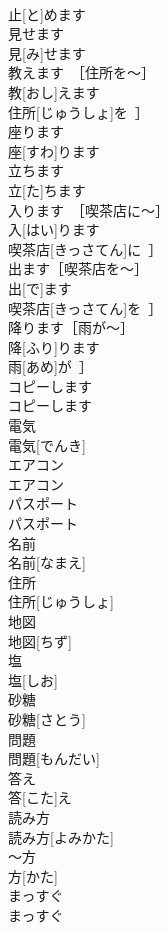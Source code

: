 \documentclass[8pt]{extreport}
\begin{document}
\begin{CJK}{UTF8}{min}
\\	止[と]めます	
\\	見せます	
\\	見[み]せます	
\\	教えます　［住所を～］	
\\	教[おし]えます　
\\	住所[じゅうしょ]を~］	
\\	座ります	
\\	座[すわ]ります	
\\	立ちます	
\\	立[た]ちます	
\\	入ります　［喫茶店に～］	
\\	入[はい]ります　
\\	喫茶店[きっさてん]に~］	
\\	出ます［喫茶店を～］	
\\	出[で]ます
\\	喫茶店[きっさてん]を~］	
\\	降ります［雨が～］	
\\	降[ふり]ります
\\	雨[あめ]が~］	
\\	コピーします	
\\	コピーします	
\\	電気	
\\	電気[でんき]	
\\	エアコン	
\\	エアコン	
\\	パスポート	
\\	パスポート	
\\	名前	
\\	名前[なまえ]	
\\	住所	
\\	住所[じゅうしょ]	
\\	地図	
\\	地図[ちず]	
\\	塩	
\\	塩[しお]	
\\	砂糖	
\\	砂糖[さとう]	
\\	問題	
\\	問題[もんだい]	
\\	答え	
\\	答[こた]え	
\\	読み方	
\\	読み方[よみかた]	
\\	～方	
\\	方[かた]	
\\	まっすぐ	
\\	まっすぐ	

\end{CJK}
\end{document}
